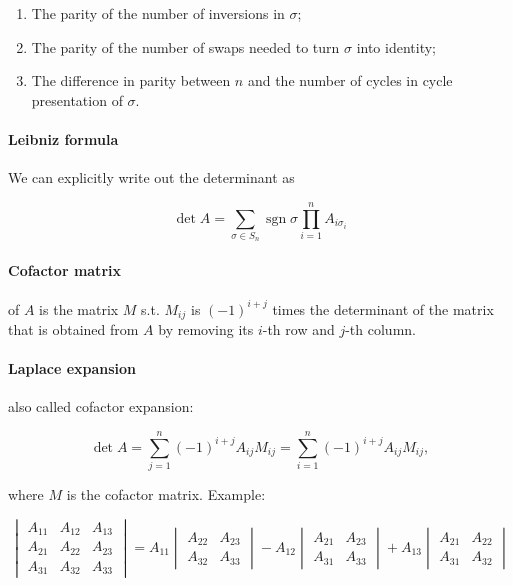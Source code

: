 \documentclass{article}
\begin{document}
\begin{enumerate}
    \item The parity of the number of inversions in $\sigma$;
    \item The parity of the number of swaps needed to turn $\sigma$ into identity;
    \item The difference in parity between $n$ and the number of cycles in cycle presentation of $\sigma$.
\end{enumerate}

\paragraph{Leibniz formula} We can explicitly write out the determinant as

$$
\det A = \sum\limits_{\sigma \in S_n} \operatorname{sgn} \sigma \prod\limits_{i=1}^n A_{i \sigma_i}
$$

\paragraph{Cofactor matrix} of $A$ is the matrix $M$ s.t. $M_{ij}$ is $(-1)^{i+j}$ times the determinant of the matrix that is obtained from $A$ by removing its $i$-th row and $j$-th column.

\paragraph{Laplace expansion} also called cofactor expansion:

$$
\det A = \sum\limits_{j=1}^n (-1)^{i+j} A_{ij} M_{ij} = \sum\limits_{i=1}^n (-1)^{i+j} A_{ij} M_{ij},
$$

where $M$ is the cofactor matrix. Example:

$$
\begin{vmatrix}
    A_{11} & A_{12} & A_{13} \\
    A_{21} & A_{22} & A_{23} \\
    A_{31} & A_{32} & A_{33}
\end{vmatrix} = A_{11} \begin{vmatrix}
    A_{22} & A_{23} \\ A_{32} & A_{33}
\end{vmatrix} - A_{12} \begin{vmatrix}
    A_{21} & A_{23} \\ A_{31} & A_{33}
\end{vmatrix} + A_{13} \begin{vmatrix}
    A_{21} & A_{22} \\
    A_{31} & A_{32}
\end{vmatrix}
$$
\end{document}
